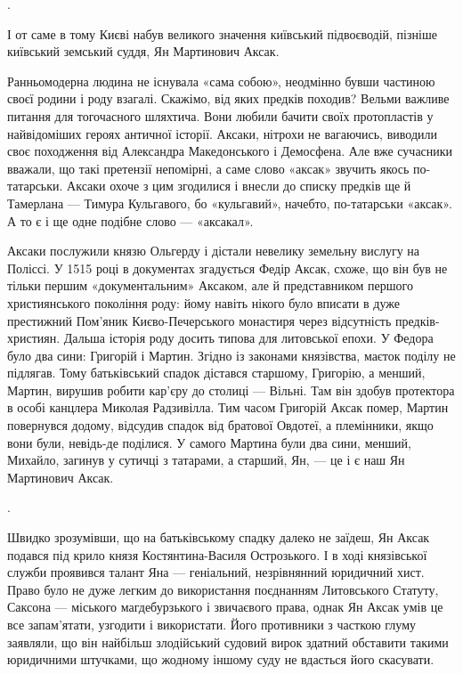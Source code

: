 .

І от саме в тому Києві набув великого значення київський підвоєводій, пізніше
київський земський суддя, Ян Мартинович Аксак. 

Ранньомодерна людина не існувала «сама собою», неодмінно бувши частиною своєї
родини і роду взагалі. Скажімо, від яких предків походив? Вельми важливе
питання для тогочасного шляхтича. Вони любили бачити своїх протопластів у
найвідоміших героях античної історії. Аксаки, нітрохи не вагаючись, виводили
своє походження від Александра Македонського і Демосфена. Але вже сучасники
вважали, що такі претензії непомірні, а саме слово «аксак» звучить якось
по-татарськи. Аксаки охоче з цим згодилися і внесли до списку предків ще й
Тамерлана — Тимура Кульгавого, бо «кульгавий», начебто, по-татарськи «аксак». А
то є і ще одне подібне слово — «аксакал».

Аксаки послужили князю Ольгерду і дістали невелику земельну вислугу на Поліссі.
У 1515 році в документах згадується Федір Аксак, схоже, що він був не тільки
першим «документальним» Аксаком, але й представником першого християнського
покоління роду: йому навіть нікого було вписати в дуже престижний Пом’яник
Києво-Печерського монастиря через відсутність предків-християн. Дальша історія
роду досить типова для литовської епохи. У Федора було два сини: Григорій і
Мартин. Згідно із законами князівства, маєток поділу не підлягав. Тому
батьківський спадок дістався старшому, Григорію, а менший, Мартин, вирушив
робити кар’єру до столиці — Вільні. Там він здобув протектора в особі канцлера
Миколая Радзивілла. Тим часом Григорій Аксак помер, Мартин повернувся додому,
відсудив спадок від братової Овдотеї, а племінники, якщо вони були, невідь-де
поділися. У самого Мартина були два сини, менший, Михайло, загинув у сутичці з
татарами, а старший, Ян, — це і є наш Ян Мартинович Аксак.

.

Швидко зрозумівши, що на батьківському спадку далеко не заїдеш, Ян Аксак
подався під крило князя Костянтина-Василя Острозького. І в ході князівської
служби проявився талант Яна — геніальний, незрівнянний юридичний хист. Право
було не дуже легким до використання поєднанням Литовського Статуту, Саксона —
міського магдебурзького і звичаєвого права, однак Ян Аксак умів це все
запам’ятати, узгодити і використати. Його противники з часткою глуму заявляли,
що він найбільш злодійський судовий вирок здатний обставити такими юридичними
штучками, що жодному іншому суду не вдасться його скасувати.


